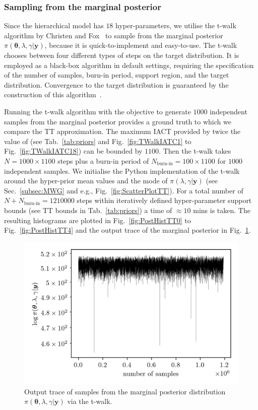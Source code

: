 \subsubsection{Sampling from the marginal posterior}
Since the hierarchical model has $18$ hyper-parameters, we utilise the t-walk algorithm by Christen and Fox~\cite{christen2010general} to sample from the marginal posterior $\pi(\bm{\theta} , \lambda, \gamma| \bm{y})$, because it is quick-to-implement and easy-to-use.
The t-walk chooses between four different types of steps on the target distribution.
It is employed as a black-box algorithm in default settings, requiring the specification of the number of samples, burn-in period, support region, and the target distribution. 
Convergence to the target distribution is guaranteed by the construction of this algorithm~\cite{christen2010general}.

Running the t-walk algorithm with the objective to generate $1000$ independent samples from the marginal posterior provides a ground truth to which we compare the TT approximation.
The maximum IACT provided by twice the value of \cite{wolff2004monte, drikHesse} (see Tab.~\ref{tab:priors} and Fig.~\ref{fig:TWalkIATC1} to Fig.~\ref{fig:TWalkIATC18}) can be bounded by $1100$.
Then the t-walk takes $N = 1000 \times 1100$ steps plus a burn-in period of $N_{\text{burn-in}} = 100 \times 1100 $ for $1000$ independent samples.
We initialise the Python implementation of the t-walk~\cite{christentwalkaccess} around the hyper-prior mean values and the mode of $\pi(\lambda ,\gamma|\bm{y})$ (see Sec.~\ref{subsec:MWG} and e.g., Fig.~\ref{fig:ScatterPlotTT}).
For a total number of $N + N_{\text{burn-in}} = 1210000$ steps within iteratively defined hyper-parameter support bounds (see TT bounds in Tab.~\ref{tab:priors}) a time of $\approx 10$ mins is taken.
The resulting histograms are plotted in Fig.~\ref{fig:PostHistTT0} to Fig.~\ref{fig:PostHistTT4} and the output trace of the marginal posterior in Fig.~\ref{fig:TraceTwalk}.
\begin{figure}[ht!]
	\centering
	\includegraphics{TraceTwalk.png}
	\caption[T-walk trace]{Output trace of samples from the marginal posterior distribution $\pi(\bm{\theta},\lambda,\gamma|\bm{y})$ via the t-walk.}
	\label{fig:TraceTwalk}
\end{figure}
\clearpage

